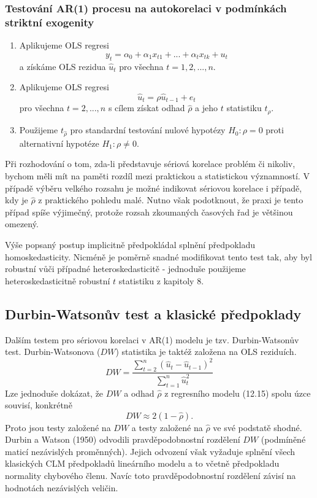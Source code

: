 \subsubsection{Testování AR(1) procesu na autokorelaci v podmínkách striktní exogenity}
\begin{enumerate}
\item Aplikujeme OLS regresi
\begin{equation}
y_t = \alpha_0 + \alpha_1 x_{t1} + ... + \alpha_t x_{tk} + u_t
\end{equation}
a získáme OLS rezidua $\hat{u}_t$ pro všechna $t = 1, 2, ..., n$.
\item Aplikujeme OLS regresi
\begin{equation}
\hat{u}_t = \rho \hat{u}_{t - 1} + e_t
\end{equation}
pro všechna $t = 2, ..., n$ s cílem získat odhad $\hat{\rho}$ a jeho $t$ statistiku $t_{\hat{\rho}}$.
\item Použijeme $t_{\hat{\rho}}$ pro standardní testování nulové hypotézy $H_0: \rho = 0$ proti alternativní hypotéze $H_1: \rho \ne 0$.
\end{enumerate}

Při rozhodování o tom, zda-li představuje sériová korelace problém či nikoliv, bychom měli mít na paměti rozdíl mezi praktickou a statistickou významností. V případě výběru velkého rozsahu je možné indikovat sériovou korelace i případě, kdy je $\hat{\rho}$ z praktického pohledu malé. Nutno však podotknout, že praxi je tento případ spíše výjimečný, protože rozsah zkoumaných časových řad je většinou omezený.

Výše popsaný postup implicitně předpokládal splnění předpokladu homoskedasticity. Nicméně je poměrně snadné modifikovat tento test tak, aby byl robustní vůči případné heteroskedasticitě - jednoduše použijeme heteroskedasticitně robustní $t$ statistiku z kapitoly 8.

\subsection{Durbin-Watsonův test a klasické předpoklady}

Dalším testem pro sériovou korelaci v AR(1) modelu je tzv. Durbin-Watsonův test. Durbin-Watsonova ($DW$) statistika je taktéž založena na OLS reziduích.
\begin{equation}
DW = \frac{\sum_{t = 2} ^ n (\hat{u}_t - \hat{u}_{t - 1})^2}{\sum_{t = 1}^n \hat{u}^2_t}
\end{equation}
Lze jednoduše dokázat, že $DW$ a odhad $\hat{\rho}$ z regresního modelu (12.15) spolu úzce souvisí, konkrétně
\begin{equation}
DW \approx 2(1 - \hat{\rho}).
\end{equation}
Proto jsou testy založené na $DW$ a testy založené na $\hat{\rho}$ ve své podstatě shodné. Durbin a Watson (1950) odvodili pravděpodobnostní rozdělení $DW$ (podmíněné maticí nezávislých proměnných). Jejich odvození však vyžaduje splnění všech klasických CLM předpokladů lineárního modelu a to včetně předpokladu normality chybového členu. Navíc toto pravděpodobnostní rozdělení závisí na hodnotách nezávislých veličin.

